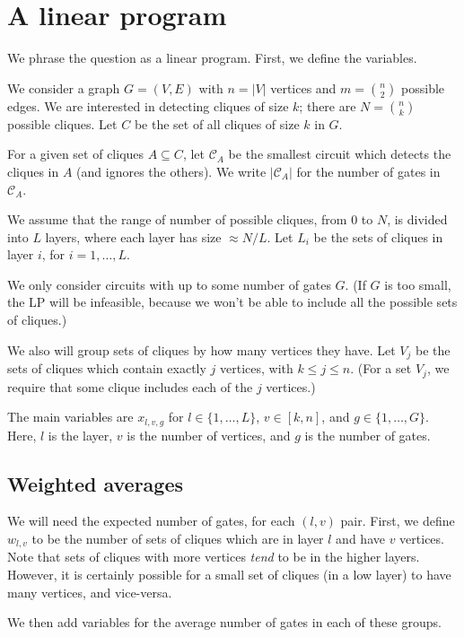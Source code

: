 \documentclass[12pt]{article}
\theoremstyle{definition}
\newcommand{\bigC}[0]{\mathcal{C}}
\begin{document}
\section{A linear program}

We phrase the question as a linear program. First, we define the variables.

We consider a graph $G=(V,E)$ with $n=|V|$ vertices and $m = \binom{n}{2}$ possible edges.
We are interested in detecting cliques of size $k$; there
are $N = \binom{n}{k}$ possible cliques.
Let $C$ be the set of all cliques of size $k$ in $G$.

For a given set of cliques $A \subseteq C$, let $\bigC_A$ be the smallest
circuit which detects the cliques in $A$ (and ignores the others).
We write $|\bigC_A|$ for the number of gates in $\bigC_A$.

We assume that the range of number of possible cliques, from 0 to $N$, is divided into $L$ layers, where each layer has size $\approx N/L$.
Let $L_i$ be the sets of cliques in layer $i$, for $i=1,\dots,L$.

We only consider circuits with up to some number of gates $G$. (If
$G$ is too small, the LP will be infeasible, because we won't be able
to include all the possible sets of cliques.)

We also will group sets of cliques by how many vertices they have.
Let $V_j$ be the sets of cliques which contain exactly $j$ vertices,
with $k \le j \le n$. (For a set $V_j$, we require that some clique includes each of the
$j$ vertices.)

The main variables are $x_{l,v,g}$ for $l \in \{1,\dots,L\}$,
$v \in [k,n]$, and $g \in \{1,\dots,G\}$. Here, $l$ is the layer,
$v$ is the number of vertices, and $g$ is the number of gates.

\subsection{Weighted averages}

We will need the expected number of gates, for each $(l,v)$ pair.
First, we define $w_{l,v}$ to be the number of sets of cliques which are in
layer $l$ and have $v$ vertices.
Note that sets of cliques with more vertices {\em tend} to
be in the higher layers. However, it is certainly possible for a small
set of cliques (in a low layer) to have many vertices, and vice-versa.

We then add variables for the average number of gates in each of
these groups.
\end{document}
